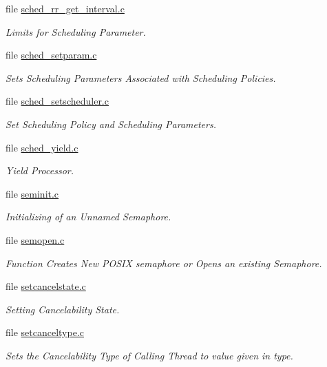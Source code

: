 \begin{DoxyCompactItemize}
file \mbox{\hyperlink{sched__rr__get__interval_8c}{sched\+\_\+rr\+\_\+get\+\_\+interval.\+c}}
\begin{DoxyCompactList}\small\item\em Limits for Scheduling Parameter. \end{DoxyCompactList}\item 
file \mbox{\hyperlink{sched__setparam_8c}{sched\+\_\+setparam.\+c}}
\begin{DoxyCompactList}\small\item\em Sets Scheduling Parameters Associated with Scheduling Policies. \end{DoxyCompactList}\item 
file \mbox{\hyperlink{sched__setscheduler_8c}{sched\+\_\+setscheduler.\+c}}
\begin{DoxyCompactList}\small\item\em Set Scheduling Policy and Scheduling Parameters. \end{DoxyCompactList}\item 
file \mbox{\hyperlink{sched__yield_8c}{sched\+\_\+yield.\+c}}
\begin{DoxyCompactList}\small\item\em Yield Processor. \end{DoxyCompactList}\item 
file \mbox{\hyperlink{seminit_8c}{seminit.\+c}}
\begin{DoxyCompactList}\small\item\em Initializing of an Unnamed Semaphore. \end{DoxyCompactList}\item 
file \mbox{\hyperlink{semopen_8c}{semopen.\+c}}
\begin{DoxyCompactList}\small\item\em Function Creates New P\+O\+S\+IX semaphore or Opens an existing Semaphore. \end{DoxyCompactList}\item 
file \mbox{\hyperlink{setcancelstate_8c}{setcancelstate.\+c}}
\begin{DoxyCompactList}\small\item\em Setting Cancelability State. \end{DoxyCompactList}\item 
file \mbox{\hyperlink{setcanceltype_8c}{setcanceltype.\+c}}
\begin{DoxyCompactList}\small\item\em Sets the Cancelability Type of Calling Thread to value given in type. \end{DoxyCompactList}\item 

\end{DoxyCompactItemize}
